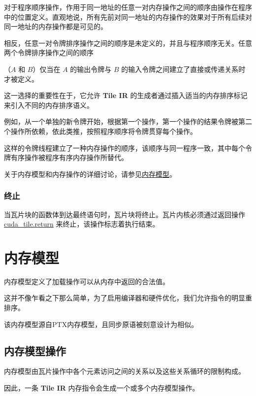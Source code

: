 \documentclass{article}
\begin{document}
对于程序顺序操作，作用于同一地址的任意一对内存操作之间的顺序由操作在程序中的位置定义。直观地说，所有先前对同一地址的内存操作的效果对于所有后续对同一地址的内存操作都是可见的。


相反，任意一对令牌排序操作之间的顺序是未定义的，并且与程序顺序无关。任意两个令牌排序操作之间的顺序

（$A$ 和 $B$）仅当在 $A$ 的输出令牌与 $B$ 的输入令牌之间建立了直接或传递关系时才被定义。


这一选择的重要性在于，它允许 \textbf{Tile IR} 的生成者通过插入适当的内存排序标记来引入不同的内存排序语义。


例如，从一个单独的新令牌开始，根据第一个操作，第一个操作的结果令牌被第二个操作所依赖，依此类推，按照程序顺序将令牌贯穿每个操作。


这样的令牌线程建立了一种内存操作的顺序，该顺序与同一程序一致，其中每个令牌有序操作被程序有序内存操作所替代。


关于内存模型和内存操作的详细讨论，请参见\href{https://docs.nvidia.com/cuda/tile-ir/latest/sections/memory_model.html#section-memory-model}{内存模型}。



\subsubsection{终止}

当瓦片块的函数体到达最终语句时，瓦片块将终止。瓦片内核必须通过返回操作 \href{https://docs.nvidia.com/cuda/tile-ir/latest/sections/operations.html#op-cuda-tile-return}{cuda\_tile.return} 来终止，该操作标志着执行结束。


\newpage
\section{内存模型}

内存模型定义了加载操作可以从内存中返回的合法值。

这并不像乍看之下那么简单，为了启用编译器和硬件优化，我们允许指令的明显重排序。


该内存模型源自PTX内存模型，且同步原语被刻意设计为相似。


\subsection{内存模型操作}

内存模型由瓦片操作中各个元素访问之间的关系以及这些关系循环的限制构成。

因此，一条 \textbf{Tile IR} 内存指令会生成一个或多个内存模型操作。
\end{document}
